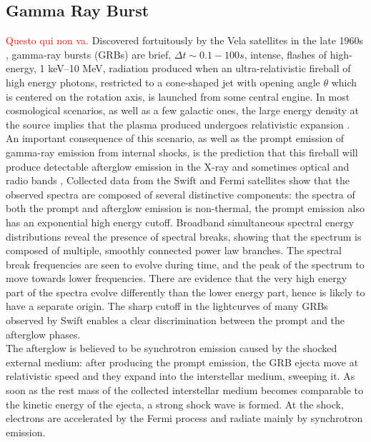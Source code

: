 \documentclass[binding=0.6cm, LaM]{sapthesis}
\newcommand{\fpg}[1]{\textcolor{red}{#1} }
\begin{document}
\subsection{Gamma Ray Burst}
\fpg{Questo qui non va.}
	Discovered fortuitously by the Vela satellites in the late 1960s \cite{180},
        gamma-ray bursts (GRBs) are brief, $\Delta t \sim 0.1-100s$, intense, flashes of high-energy, 1 keV–10 MeV, radiation
        produced when an ultra-relativistic fireball of high energy photons, restricted to a cone-shaped jet with opening angle $\theta$
	which is centered on the rotation axis, is launched from some central engine.
        In most cosmological scenarios, as well as a few galactic ones,
        the large energy density at the source implies that the plasma produced
        undergoes relativistic expansion \cite{181}.
        An important consequence of this scenario, as well as the prompt emission of gamma-ray emission from internal shocks,
        is the prediction that this fireball will produce detectable afterglow emission in the X-ray and sometimes optical and radio bands \cite{182},
        Collected data from the Swift and Fermi satellites show
        that the observed spectra are composed of several distinctive components:
        the spectra of both the prompt and afterglow emission is non-thermal,
        the prompt emission also has an exponential high energy cutoff.
        Broadband simultaneous spectral energy distributions
        reveal the presence of spectral breaks, showing that the spectrum is composed of multiple,
        smoothly connected power law branches. 
        The spectral break frequencies are seen to evolve during time,
        and the peak of the spectrum to move towards lower frequencies.
        There are evidence that the very high energy part of the spectra evolve differently than the lower energy part,
        hence is likely to have a separate origin. 
        The sharp cutoff in the lightcurves of many GRBs observed by Swift enables a clear discrimination between the prompt and the afterglow phases.  \\
        The afterglow is believed to be synchrotron emission caused by the shocked external medium: after producing the prompt emission, the GRB ejecta move at relativistic speed
        and they expand into the interstellar medium, sweeping it.
        As soon as the rest mass of the collected interstellar medium becomes comparable
        to the kinetic energy of the ejecta, a strong shock wave is formed.
        At the shock, electrons are accelerated by the Fermi process and radiate mainly by synchrotron emission\cite{153,162}.
\end{document}

